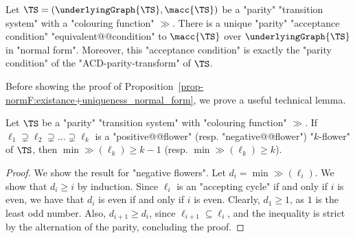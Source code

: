 \documentclass{theoretics}
\begin{document}
\begin{proposition}\label{prop-normF:existance+uniqueness_normal_form}
	Let $\TS = (\underlyingGraph{\TS}, \macc{\TS})$ be a "parity" "transition system" with a "colouring function" $\gg$.
	There is a unique "parity" "acceptance condition"  %
	"equivalent@@condition" to $\macc{\TS}$ over $\underlyingGraph{\TS}$ in "normal form".
	Moreover, this "acceptance condition" is exactly the "parity condition" of the "ACD-parity-transform" of $\TS$.
\end{proposition}

Before showing the proof of Proposition~\ref{prop-normF:existance+uniqueness_normal_form}, we prove a useful technical lemma.
\begin{lemma}\label{lemma-normF:flowers-lower-bound-in-parity}
	Let $\TS$ be a "parity" "transition system" with "colouring function" $\gg$. If $\ell_1\supsetneq \ell_2 \supsetneq \dots \supsetneq \ell_{k}$ is a "positive@@flower" (resp. "negative@@flower") "$k$-flower" of $\TS$, then $\min \gg(\ell_k)\geq k-1$ (resp. $\min \gg(\ell_k)\geq k$).
\end{lemma}
\begin{proof}
	We show the result for "negative flowers". Let $d_i = \min \gg(\ell_i)$. We show that $d_i\geq i$ by induction. Since $\ell_i$ is an "accepting cycle" if and only if $i$ is even, we have that $d_i$ is even if and only if $i$ is even. Clearly, $d_1\geq 1$, as $1$ is the least odd number. Also, $d_{i+1}\geq d_i$, since $ \ell_{i+1}\subseteq \ell_i$, and the inequality is strict by the alternation of the parity, concluding the proof.
\end{proof}
\end{document}
